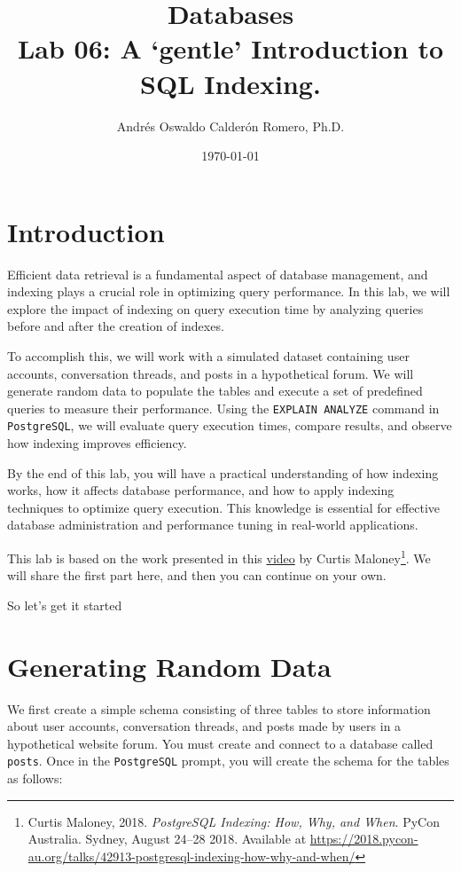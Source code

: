 \documentclass{article}
\title{Databases \\ Lab 06: A `gentle' Introduction to SQL Indexing.}
\author{Andrés Oswaldo Calderón Romero, Ph.D.}
\date{\today}
\begin{document}
\maketitle

\section{Introduction}

Efficient data retrieval is a fundamental aspect of database management, and indexing plays a crucial role in optimizing query performance. In this lab, we will explore the impact of indexing on query execution time by analyzing queries before and after the creation of indexes.

To accomplish this, we will work with a simulated dataset containing user accounts, conversation threads, and posts in a hypothetical forum. We will generate random data to populate the tables and execute a set of predefined queries to measure their performance. Using the \texttt{EXPLAIN ANALYZE} command in \texttt{PostgreSQL}, we will evaluate query execution times, compare results, and observe how indexing improves efficiency.

By the end of this lab, you will have a practical understanding of how indexing works, how it affects database performance, and how to apply indexing techniques to optimize query execution. This knowledge is essential for effective database administration and performance tuning in real-world applications.

This lab is based on the work presented in this \href{https://youtu.be/clrtT_4WBAw?si=Q5Rmt7YVsykuS715}{video} by Curtis Maloney\footnote{Curtis Maloney, 2018. \textit{PostgreSQL Indexing: How, Why, and When}. PyCon Australia. Sydney, August 24–28 2018. Available at \url{https://2018.pycon-au.org/talks/42913-postgresql-indexing-how-why-and-when/}}. We will share the first part here, and then you can continue on your own.

So let's get it started

\section{Generating Random Data}
We first create a simple schema consisting of three tables to store information about user accounts, conversation threads, and posts made by users in a hypothetical website forum. You must create and connect to a database called \texttt{posts}. Once in the \texttt{PostgreSQL} prompt, you will create the schema for the tables as follows:
\end{document}
